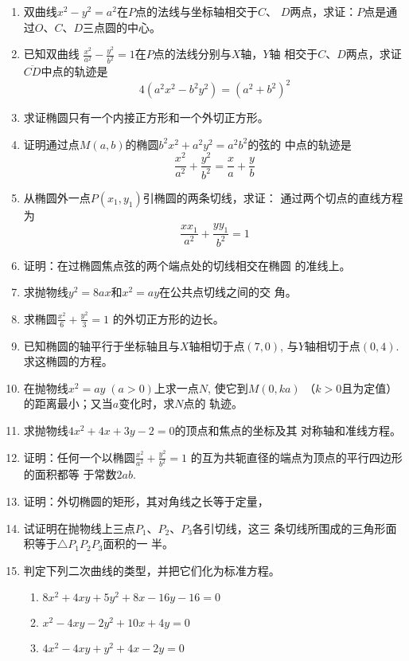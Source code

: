 \begin{enumerate}
\item 双曲线$x^2-y^2=a^2$在$P$点的法线与坐标轴相交于$C$、
$D$两点，求证：$P$点是通过$O$、$C$、$D$三点圆的中心。
\item 已知双曲线
$\frac{x^2}{a^2}-\frac{y^2}{b^2}=1$在$P$点的法线分别与$X$轴，$Y$轴
相交于$C$、$D$两点，求证$\overline{CD}$中点的轨迹是
\[4(a^2x^2-b^2y^2)=(a^2+b^2)^2\]
\item 求证椭圆只有一个内接正方形和一个外切正方形。
\item 证明通过点$M(a,b)$的椭圆$b^2x^2+a^2y^2=a^2b^2$的弦的
中点的轨迹是
\[\frac{x^2}{a^2}+\frac{y^2}{b^2}=\frac{x}{a}+\frac{y}{b}\]
\item 从椭圆外一点$P(x_1,y_1)$引椭圆的两条切线，求证：
通过两个切点的直线方程为
\[\frac{xx_1}{a^2}+\frac{yy_1}{b^2}=1\]

\item 证明：在过椭圆焦点弦的两个端点处的切线相交在椭圆
的准线上。
\item 求抛物线$y^2=8ax$和$x^2=ay$在公共点切线之间的交
角。
\item 求椭圆$\frac{x^2}{6}+\frac{y^2}{3}=1$
的外切正方形的边长。
\item 已知椭圆的轴平行于坐标轴且与$X$轴相切于点$(7,0)$, 
与$Y$轴相切于点$(0,4)$. 求这椭圆的方程。
\item 在抛物线$x^2=ay\; (a>0)$上求一点$N$, 使它到$M(0,ka)$
（$k>0$且为定值）的距离最小；又当$a$变化时，求$N$点的
轨迹。
\item 求抛物线$4x^2+4x+3y-2=0$的顶点和焦点的坐标及其
对称轴和准线方程。
\item 证明：任何一个以椭圆$\frac{x^2}{a^2}+\frac{y^2}{b^2}=1$
的互为共轭直径的端点为顶点的平行四边形的面积都等
于常数$2ab$. 
\item 证明：外切椭圆的矩形，其对角线之长等于定量，
\item 试证明在抛物线上三点$P_1$、$P_2$、$P_3$各引切线，这三
条切线所围成的三角形面积等于$\triangle P_1P_2P_3$面积的一
半。
\item 判定下列二次曲线的类型，并把它们化为标准方程。
\begin{enumerate}
    \item $8x^2+4xy+5y^2+8x-16y-16=0$
    \item $x^2-4xy-2y^2+10x+4y=0$
    \item $4x^2-4xy+y^2+4x-2y=0$
\end{enumerate}
\end{enumerate}



